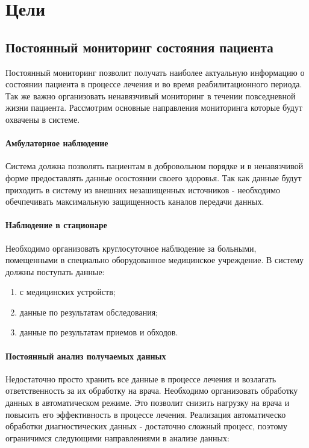 \newpage
\chapter{Цели}
\section{Постоянный мониторинг состояния пациента	}

Постоянный мониторинг позволит получать наиболее актуальную информацию о
состоянии пациента в процессе лечения и во время реабилитационного периода. Так
же важно организовать ненавязчивый мониторинг в течении повседневной жизни
пациента. Рассмотрим основные направления мониторинга которые будут охвачены в
системе.

\subsubsection{Амбулаторное наблюдение}

Система должна позволять пациентам в добровольном порядке и в ненавязчивой форме
предоставлять данные осостоянии своего здоровья. Так как данные будут приходить
в систему из внешних незашищенных источников - необходимо обечпечивать
максимальную защищенность каналов передачи данных.

\subsubsection{Наблюдение в стационаре}

Необходимо организовать круглосуточное наблюдение за больными, помещенными в
специально оборудованное медицинское учреждение. В систему должны поступать
данные:

\begin{enumerate}
	\item с медицинских устройств;
	\item данные по результатам обследования;
	\item данные по результатам приемов и обходов.
\end{enumerate}

\subsubsection{Постоянный анализ получаемых данных}

Недостаточно просто хранить все данные в процессе лечения и возлагать
ответственность за их обработку на врача. Необходимо организовать обработку
данных в автоматическом режиме. Это позволит снизить нагрузку на врача и
повысить его эффективность в процессе лечения.
Реализация автоматическо обработки диагностических данных - достаточно сложный
процесс, поэтому ограничимся следующими направлениями в анализе данных:

